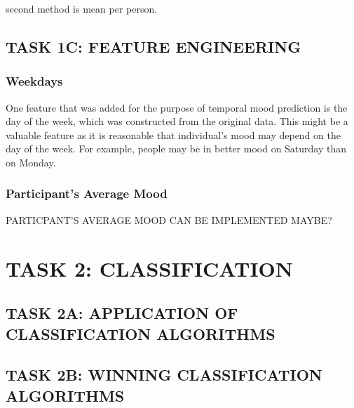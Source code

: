 \documentclass[runningheads]{llncs}
\begin{document}
second method is mean per person. 

\subsection{TASK 1C: FEATURE ENGINEERING}
\subsubsection{Weekdays}
One feature that was added for the purpose of temporal mood prediction is the day of the week, which was constructed from the original data. This might be a valuable feature as it is reasonable that individual's mood may depend on the day of the week. For example, people may be in better mood on Saturday than on Monday.
\subsubsection{Participant's Average Mood}
PARTICPANT'S AVERAGE MOOD CAN BE IMPLEMENTED MAYBE?

\section{TASK 2: CLASSIFICATION }
\subsection{TASK 2A: APPLICATION OF CLASSIFICATION ALGORITHMS}

\subsection{TASK 2B: WINNING CLASSIFICATION ALGORITHMS}
\end{document}
